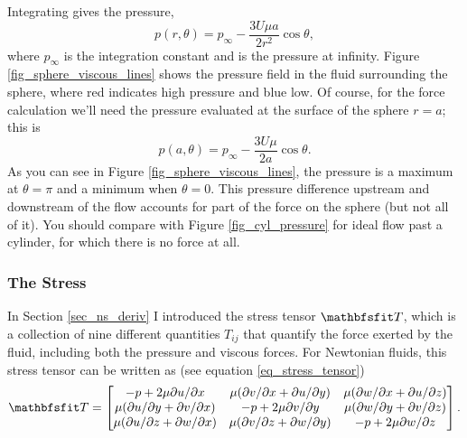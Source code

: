 Integrating gives the pressure,
\begin{equation}
\label{eq_sphere_slow_p}
\boxed{
p(r, \theta) = p_\infty - \frac{3U \mu a}{2r^2} \cos \theta,
}
\end{equation}
where $p_\infty$ is the integration constant and is the pressure at infinity.  Figure \ref{fig_sphere_viscous_lines} shows the pressure field in the fluid surrounding the sphere, where red indicates high pressure and blue low.  Of course, for the force calculation we'll need the pressure evaluated at the surface of the sphere $r=a$; this is
\begin{equation}
\label{eq_sphere_p_a}
p(a, \theta) = p_\infty -\frac{3U\mu}{2a} \cos \theta.
\end{equation}
As you can see in Figure \ref{fig_sphere_viscous_lines}, the pressure is a maximum at $\theta = \pi$ and a minimum when $\theta = 0$.  This pressure difference upstream and downstream of the flow accounts for part of the force on the sphere (but not all of it).  You should compare with Figure \ref{fig_cyl_pressure} for ideal flow past a cylinder, for which there is no force at all.

\subsubsection{The Stress}

In Section \ref{sec_ns_deriv} I introduced the stress tensor $\tens{T}$, which is a collection of nine different quantities $T_{ij}$ that quantify the force exerted by the fluid, including both the pressure and viscous forces.  For Newtonian fluids, this stress tensor can be written as (see equation \ref{eq_stress_tensor})
\[
\tens{T} = \begin{bmatrix}
- p + 2 \mu \partial u / \partial x  &  \mu (\partial v / \partial x + \partial u / \partial y)  &   \mu (\partial w / \partial x + \partial u / \partial z) \\
\mu (\partial u / \partial y + \partial v / \partial x)  & -p + 2\mu  \partial v / \partial y  &  \mu (\partial w / \partial y + \partial v / \partial z) \\
\mu (\partial u / \partial z + \partial w / \partial x)  &  \mu (\partial v / \partial z + \partial w / \partial y) & -p + 2\mu  \partial w / \partial z
\end{bmatrix}.
\]

